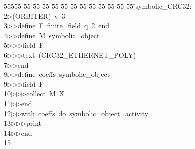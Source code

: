 %
%
\begin{tabbing}
55555 \= 55 \= 55 \= 55 \= 55 \= 55 \= 55 \= 55 \= 55 \= 55 \= 55 \= 55 \= 55 \= \>symbolic\_CRC32:\\[0pt]
2\>$\triangleright$\>(ORBITER)\ v\ 3\ \\[0pt]
3\>$\triangleright$\>$\triangleright$\>define\ F\ finite\_field\ q\ 2\ end\ \\[0pt]
4\>$\triangleright$\>$\triangleright$\>define\ M\ symbolic\_object\ \\[0pt]
5\>$\triangleright$\>$\triangleright$\>$\triangleright$\>field\ F\ \\[0pt]
6\>$\triangleright$\>$\triangleright$\>$\triangleright$\>text\ (CRC32\_ETHERNET\_POLY)\ \\[0pt]
7\>$\triangleright$\>$\triangleright$\>end\ \\[0pt]
8\>$\triangleright$\>$\triangleright$\>define\ coeffs\ symbolic\_object\ \\[0pt]
9\>$\triangleright$\>$\triangleright$\>$\triangleright$\>field\ F\ \\[0pt]
10\>$\triangleright$\>$\triangleright$\>$\triangleright$\>collect\ M\ X\ \\[0pt]
11\>$\triangleright$\>$\triangleright$\>end\ \\[0pt]
12\>$\triangleright$\>$\triangleright$\>with\ coeffs\ do\ symbolic\_object\_activity\ \\[0pt]
13\>$\triangleright$\>$\triangleright$\>$\triangleright$\>print\ \\[0pt]
14\>$\triangleright$\>$\triangleright$\>end\\[0pt]
15\>\end{tabbing}
